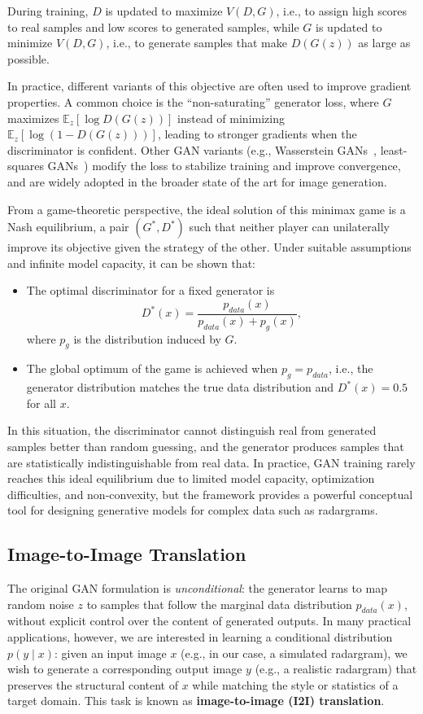 During training, $D$ is updated to maximize $V(D, G)$, i.e., to assign high scores to real samples and low scores to generated samples, while $G$ is updated to minimize $V(D, G)$, i.e., to generate samples that make $D(G(z))$ as large as possible.

In practice, different variants of this objective are often used to improve gradient properties.
A common choice is the \enquote{non-saturating} generator loss, where $G$ maximizes $\mathbb{E}_{z}[\log D(G(z))]$ instead of minimizing $\mathbb{E}_{z}[\log (1 - D(G(z)))]$, leading to stronger gradients when the discriminator is confident.
Other GAN variants (e.g., Wasserstein GANs~\cite{Arjovsky2017}, least-squares GANs~\cite{Mao2017}) modify the loss to stabilize training and improve convergence, and are widely adopted in the broader state of the art for image generation.

From a game-theoretic perspective, the ideal solution of this minimax game is a Nash equilibrium, a pair $(G^*, D^*)$ such that neither player can unilaterally improve its objective given the strategy of the other.
Under suitable assumptions and infinite model capacity, it can be shown that:
\begin{itemize}
    \item The optimal discriminator for a fixed generator is
    \begin{equation}
    D^*(x) = \frac{p_{data}(x)}{p_{data}(x) + p_g(x)},
    \end{equation}
    where $p_g$ is the distribution induced by $G$.
    \item The global optimum of the game is achieved when $p_g = p_{data}$, i.e., the generator distribution matches the true data distribution and $D^*(x) = 0.5$ for all $x$.
\end{itemize}
In this situation, the discriminator cannot distinguish real from generated samples better than random guessing, and the generator produces samples that are statistically indistinguishable from real data.
In practice, GAN training rarely reaches this ideal equilibrium due to limited model capacity, optimization difficulties, and non-convexity, but the framework provides a powerful conceptual tool for designing generative models for complex data such as radargrams.

\subsection{Image-to-Image Translation}
The original GAN formulation is \emph{unconditional}: the generator learns to map random noise $z$ to samples that follow the marginal data distribution $p_{data}(x)$, without explicit control over the content of generated outputs.
In many practical applications, however, we are interested in learning a conditional distribution $p(y \mid x)$: given an input image $x$ (e.g., in our case, a simulated radargram), we wish to generate a corresponding output image $y$ (e.g., a realistic radargram) that preserves the structural content of $x$ while matching the style or statistics of a target domain.
This task is known as \textbf{image-to-image (I2I) translation}.

